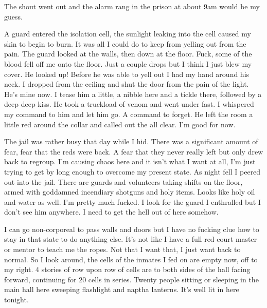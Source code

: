 The shout went out and the alarm rang in the prison at about 9am would be my guess.

A guard entered the isolation cell, the sunlight leaking into the cell caused my skin to begin to burn. It was all I could do to keep from yelling out from the pain. The guard looked at the walls, then down at the floor. Fuck, some of the blood fell off me onto the floor. Just a couple drops but I think I just blew my cover. He looked up! Before he was able to yell out I had my hand around his neck. I dropped from the ceiling and shut the door from the pain of the light. He's mine now. I tease him a little, a nibble here and a tickle there, followed by a deep deep kiss. He took a truckload of venom and went under fast. I whispered my command to him and let him go. A command to forget. He left the room a little red around the collar and called out the all clear. I'm good for now.

The jail was rather busy that day while I hid. There was a significant amount of fear, fear that the reds were back. A fear that they never really left but only drew back to regroup. I'm causing chaos here and it isn't what I want at all, I'm just trying to get by long enough to overcome my present state. As night fell I peered out into the jail. There are guards and volunteers taking shifts on the floor, armed with goddamned incendiary shotguns and holy items. Looks like holy oil and water as well. I'm pretty much fucked. I look for the guard I enthralled but I don't see him anywhere. I need to get the hell out of here somehow.

I can go non-corporeal to pass walls and doors but I have no fucking clue how to stay in that state to do anything else. It's not like I have a full red court master or mentor to teach me the ropes. Not that I want that, I just want back to normal. So I look around, the cells of the inmates I fed on are empty now, off to my right. 4 stories of row upon row of cells are to both sides of the hall facing forward, continuing for 20 cells in series. Twenty people sitting or sleeping in the main hall here sweeping flashlight and naptha lanterns. It's well lit in here tonight.



